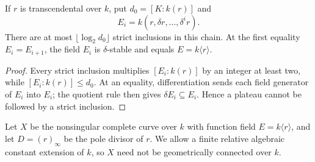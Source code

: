 \begin{lemma}
\label{int:stabilize}
If $r$ is transcendental over $k$, put $d_0=[K:k(r)]$ and
\[
 E_i=k(r,\delta r,\ldots,\delta^i r).
\]
There are at most $\lfloor\log_2 d_0\rfloor$ strict inclusions in this
chain.  At the first equality $E_i=E_{i+1}$, the field $E_i$ is
$\delta$-stable and equals $E=k\langle r\rangle$.
\end{lemma}
\begin{proof}
Every strict inclusion multiplies $[E_i:k(r)]$ by an integer at least two,
while $[E_i:k(r)]\leq d_0$.  At an equality, differentiation sends each
field generator of $E_i$ into $E_i$; the quotient rule then gives
$\delta E_i\subseteq E_i$.  Hence a plateau cannot be followed by a
strict inclusion.
\end{proof}

Let $X$ be the nonsingular complete curve over $k$ with function field
$E=k\langle r\rangle$, and let $D=(r)_\infty$ be the pole divisor of $r$.
We allow a finite relative algebraic constant extension of $k$, so $X$
need not be geometrically connected over $k$.

